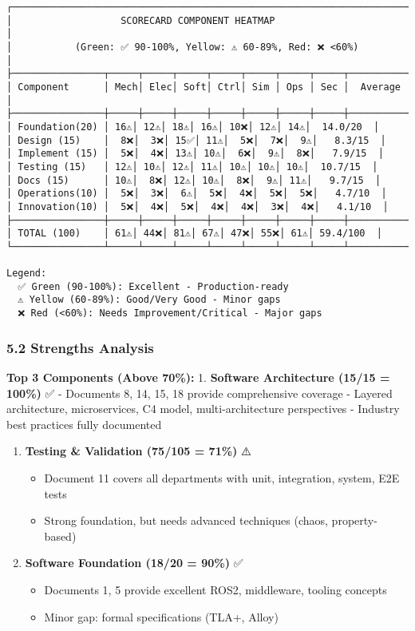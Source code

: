 \documentclass[
]{article}
\providecommand{\tightlist}{%
  \setlength{\itemsep}{0pt}\setlength{\parskip}{0pt}}
\begin{document}
\begin{verbatim}
┌────────────────────────────────────────────────────────────────────────┐
│                   SCORECARD COMPONENT HEATMAP                          │
│           (Green: ✅ 90-100%, Yellow: ⚠️ 60-89%, Red: ❌ <60%)         │
├────────────────┬─────┬─────┬─────┬─────┬─────┬─────┬─────┬───────────┤
│ Component      │ Mech│ Elec│ Soft│ Ctrl│ Sim │ Ops │ Sec │  Average  │
├────────────────┼─────┼─────┼─────┼─────┼─────┼─────┼─────┼───────────┤
│ Foundation(20) │ 16⚠️│ 12⚠️│ 18⚠️│ 16⚠️│ 10❌│ 12⚠️│ 14⚠️│  14.0/20  │
│ Design (15)    │  8❌│  3❌│ 15✅│ 11⚠️│  5❌│  7❌│  9⚠️│   8.3/15  │
│ Implement (15) │  5❌│  4❌│ 13⚠️│ 10⚠️│  6❌│  9⚠️│  8❌│   7.9/15  │
│ Testing (15)   │ 12⚠️│ 10⚠️│ 12⚠️│ 11⚠️│ 10⚠️│ 10⚠️│ 10⚠️│  10.7/15  │
│ Docs (15)      │ 10⚠️│  8❌│ 12⚠️│ 10⚠️│  8❌│  9⚠️│ 11⚠️│   9.7/15  │
│ Operations(10) │  5❌│  3❌│  6⚠️│  5❌│  4❌│  5❌│  5❌│   4.7/10  │
│ Innovation(10) │  5❌│  4❌│  5❌│  4❌│  4❌│  3❌│  4❌│   4.1/10  │
├────────────────┼─────┼─────┼─────┼─────┼─────┼─────┼─────┼───────────┤
│ TOTAL (100)    │ 61⚠️│ 44❌│ 81⚠️│ 67⚠️│ 47❌│ 55❌│ 61⚠️│ 59.4/100  │
└────────────────┴─────┴─────┴─────┴─────┴─────┴─────┴─────┴───────────┘

Legend:
  ✅ Green (90-100%): Excellent - Production-ready
  ⚠️ Yellow (60-89%): Good/Very Good - Minor gaps
  ❌ Red (<60%): Needs Improvement/Critical - Major gaps
\end{verbatim}

\hypertarget{strengths-analysis}{%
\subsubsection{5.2 Strengths Analysis}\label{strengths-analysis}}

\textbf{Top 3 Components (Above 70\%):} 1. \textbf{Software Architecture
(15/15 = 100\%)} ✅ - Documents 8, 14, 15, 18 provide comprehensive
coverage - Layered architecture, microservices, C4 model,
multi-architecture perspectives - Industry best practices fully
documented

\begin{enumerate}
\def\labelenumi{\arabic{enumi}.}
\setcounter{enumi}{1}
\tightlist
\item
  \textbf{Testing \& Validation (75/105 = 71\%)} ⚠️

  \begin{itemize}
  \tightlist
  \item
    Document 11 covers all departments with unit, integration, system,
    E2E tests
  \item
    Strong foundation, but needs advanced techniques (chaos,
    property-based)
  \end{itemize}
\item
  \textbf{Software Foundation (18/20 = 90\%)} ✅

  \begin{itemize}
  \tightlist
  \item
    Documents 1, 5 provide excellent ROS2, middleware, tooling concepts
  \item
    Minor gap: formal specifications (TLA+, Alloy)
  \end{itemize}
\end{enumerate}
\end{document}
